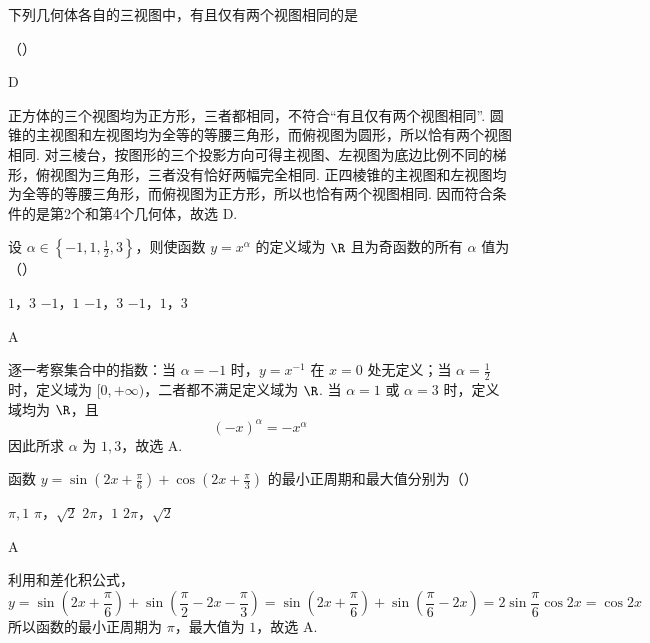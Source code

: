 \begin{problem}
下列几何体各自的三视图中，有且仅有两个视图相同的是


（\quad）

\choices
    {}
    {}
    {}
    {}

\begin{answer}D\end{answer}

\begin{solution}
正方体的三个视图均为正方形，三者都相同，不符合“有且仅有两个视图相同”. 圆锥的主视图和左视图均为全等的等腰三角形，而俯视图为圆形，所以恰有两个视图相同. 对三棱台，按图形的三个投影方向可得主视图、左视图为底边比例不同的梯形，俯视图为三角形，三者没有恰好两幅完全相同. 正四棱锥的主视图和左视图均为全等的等腰三角形，而俯视图为正方形，所以也恰有两个视图相同. 因而符合条件的是第2个和第4个几何体，故选 D.
\end{solution}
\end{problem}

\begin{problem}
设 \( \alpha \in \left\{-1, 1, \frac{1}{2}, 3\right\} \)，则使函数 \( y = x^{\alpha} \) 的定义域为 \(\R\) 且为奇函数的所有 \( \alpha \) 值为（\quad）

\choices
    {\(1\)，\(3\)}
    {\(-1\)，\(1\)}
    {\(-1\)，\(3\)}
    {\(-1\)，\(1\)，\(3\)}

\begin{answer}A\end{answer}

\begin{solution}
逐一考察集合中的指数：当 \(\alpha=-1\) 时，\(y=x^{-1}\) 在 \(x=0\) 处无定义；当 \(\alpha=\frac{1}{2}\) 时，定义域为 \([0,+\infty)\)，二者都不满足定义域为 \(\R\). 当 \(\alpha=1\) 或 \(\alpha=3\) 时，定义域均为 \(\R\)，且
\[
(-x)^\alpha=-x^\alpha
\]
因此所求 \(\alpha\) 为 \(1,3\)，故选 A.
\end{solution}
\end{problem}

\begin{problem}
函数 \( y = \sin \left(2x + \frac{\pi}{6}\right) + \cos \left(2x + \frac{\pi}{3}\right) \) 的最小正周期和最大值分别为（\quad）

\choices
    {\(\pi, 1\)}
    {\(\pi\)，\(\sqrt{2}\)}
    {\(2\pi\)，\(1\)}
    {\(2\pi\)，\(\sqrt{2}\)}

\begin{answer}A\end{answer}

\begin{solution}
利用和差化积公式，
\[
y=\sin\left(2x+\frac{\pi}{6}\right)+\sin\left(\frac{\pi}{2}-2x-\frac{\pi}{3}\right)=\sin\left(2x+\frac{\pi}{6}\right)+\sin\left(\frac{\pi}{6}-2x\right)=2\sin\frac{\pi}{6}\cos 2x=\cos 2x
\]
所以函数的最小正周期为 \(\pi\)，最大值为 \(1\)，故选 A.
\end{solution}
\end{problem}

